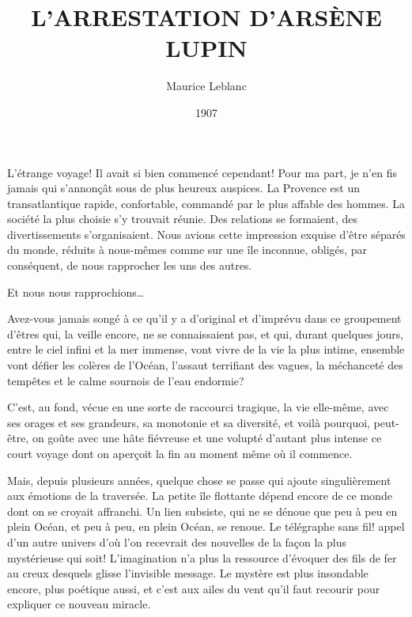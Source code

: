 \documentclass[12pt,a4paper]{book}
\begin{document}
\title{L’ARRESTATION D’ARSÈNE LUPIN}
\author{Maurice Leblanc}
\date{1907}

\maketitle





L’étrange voyage! Il avait si bien commencé cependant! Pour ma part, je n’en fis jamais qui s’annonçât sous de plus heureux auspices. La Provence est un transatlantique rapide, confortable, commandé par le plus affable des hommes. La société la plus choisie s’y trouvait réunie. Des relations se formaient, des divertissements s’organisaient. Nous avions cette impression exquise d’être séparés du monde, réduits à nous-mêmes comme sur une île inconnue, obligés, par conséquent, de nous rapprocher les uns des autres.

Et nous nous rapprochions…

Avez-vous jamais songé à ce qu’il y a d’original et d’imprévu dans ce groupement d’êtres qui, la veille encore, ne se connaissaient pas, et qui, durant quelques jours, entre le ciel infini et la mer immense, vont vivre de la vie la plus intime, ensemble vont défier les colères de l’Océan, l’assaut terrifiant des vagues, la méchanceté des tempêtes et le calme sournois de l’eau endormie?

C’est, au fond, vécue en une sorte de raccourci tragique, la vie elle-même, avec ses orages et ses grandeurs, sa monotonie et sa diversité, et voilà pourquoi, peut-être, on goûte avec une hâte fiévreuse et une volupté d’autant plus intense ce court voyage dont on aperçoit la fin au moment même où il commence.

Mais, depuis plusieurs années, quelque chose se passe qui ajoute singulièrement aux émotions de la traversée. La petite île flottante dépend encore de ce monde dont on se croyait affranchi. Un lien subsiste, qui ne se dénoue que peu à peu en plein Océan, et peu à peu, en plein Océan, se renoue. Le télégraphe sans fil! appel d’un autre univers d’où l’on recevrait des nouvelles de la façon la plus mystérieuse qui soit! L’imagination n’a plus la ressource d’évoquer des fils de fer au creux desquels glisse l’invisible message. Le mystère est plus insondable encore, plus poétique aussi, et c’est aux ailes du vent qu’il faut recourir pour expliquer ce nouveau miracle.
\end{document}
